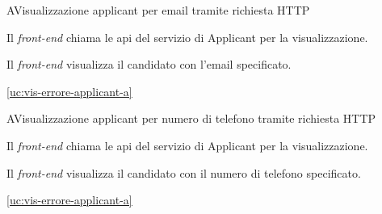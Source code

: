 \begin{usecase}{4.2}{A}{Visualizzazione applicant per email tramite richiesta HTTP}



	\begin{ucscenarioprincipale}
		\item Il \textit{front-end} chiama le \acrshort{api} del servizio di Applicant per la visualizzazione.
		\item Il \textit{front-end} visualizza il candidato con l'email specificato.
	\end{ucscenarioprincipale}

	\begin{ucestensioni}
		\item \ref{uc:vis-errore-applicant-a}
	\end{ucestensioni}


	\label{uc:vis-applicant-email-http-a}
\end{usecase}

\begin{usecase}{4.3}{A}{Visualizzazione applicant per numero di telefono tramite richiesta HTTP}



	\begin{ucscenarioprincipale}
		\item Il \textit{front-end} chiama le \acrshort{api} del servizio di Applicant per la visualizzazione.
		\item Il \textit{front-end} visualizza il candidato con il numero di telefono specificato.
	\end{ucscenarioprincipale}

	\begin{ucestensioni}
		\item \ref{uc:vis-errore-applicant-a}
	\end{ucestensioni}


	\label{uc:vis-applicant-phone-http-a}
\end{usecase}


